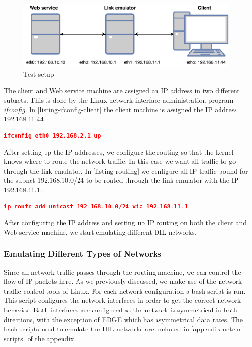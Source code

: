 \begin{figure}[h]
\includegraphics[scale=0.73]{images/testing_environment.pdf}
\caption{Test setup}
\label{figure-testing-environment}
\end{figure}

The client and Web service machine are assigned an IP address in two different
subnets. This is done by the Linux network interface administration program
\textit{ifconfig}. In \cref{listing-ifconfig-client} the client machine is
assigned the IP address 192.168.11.44.

\begin{lstlisting}[frame=single, language=json, caption="Setting the IP address a network interface", label=listing-ifconfig-client]
ifconfig eth0 192.168.2.1 up
\end{lstlisting}

After setting up the IP addresses, we configure the routing so that the kernel
knows where to route the network traffic. In this case we want all traffic to go
through the link emulator. In \cref{listing-routing} we configure all IP traffic
bound for the subnet 192.168.10.0/24 to be routed through the link emulator with
the IP 192.168.11.1.

\begin{lstlisting}[frame=single, language=json, caption="Configuring routing rules", label=listing-routing]
ip route add unicast 192.168.10.0/24 via 192.168.11.1
\end{lstlisting}

After configuring the IP address and setting up IP routing on both the client
and Web service machine, we start emulating different DIL networks.

\subsubsection{Emulating Different Types of Networks}

Since all network traffic passes through the routing machine, we can control the
flow of IP packets here. As we previously discussed, we make use of the network
traffic control tools of Linux. For each network configuration a bash script is
run. This script configures the network interfaces in order to get the correct
network behavior. Both interfaces are configured so the network is symmetrical
in both directions, with the exception of EDGE which has asymmetrical data
rates. The bash scripts used to emulate the DIL networks are included in
\cref{appendix-netem-scripts} of the appendix.


